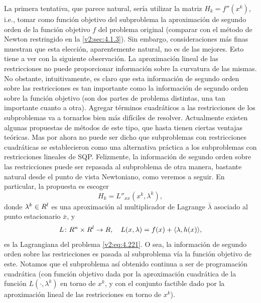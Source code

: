 La primera tentativa, que parece natural, sería utilizar la matriz $H_k = f''(x^k)$, i.e., tomar como función objetivo del subproblema la aproximación de segundo orden de la función objetivo $f$ del problema original (comparar con el método de Newton restringido en la \cref{v2:sec:4.1.3}). Sin embargo, consideraciones más finas muestran que esta elección, aparentemente natural, no es de las mejores. Esto tiene a ver con la siguiente observación. La aproximación lineal de las restricciones no puede proporcionar información sobre la curvatura de las mismas. No obstante, intuitivamente, es claro que esta información de segundo orden sobre las restricciones es tan importante como la información de segundo orden sobre la función objetivo (son dos partes de problema distintas, una tan importante cuanto a otra). Agregar términos cuadráticos a las restricciones de los subproblemas va a tornarlos bien más difíciles de resolver. Actualmente existen algunas propuestas de métodos de este tipo, que hasta tienen ciertas ventajas teóricas. Mas por ahora no puede ser dicho que subproblemas con restricciones cuadráticas se establecieron como una alternativa práctica a los subproblemas con restricciones lineales de SQP. Felizmente, la información de segundo orden sobre las restricciones puede ser repasada al subproblema de otra manera, bastante natural desde el punto de vista Newtoniano, como veremos a seguir. En particular, la propuesta es escoger
\begin{equation}
    H_k = L''_{xx}(x^k, \lambda^k),
    \label{v2:eq:4.223}
\end{equation}
donde $\lambda^k \in R^l$ es una aproximación al multiplicador de Lagrange $\bar{\lambda}$ asociado al punto estacionario $\bar{x}$, y
\[
    L \colon R^n \times R^l \to R, \quad L(x, \lambda) = f(x) + \langle \lambda, h(x) \rangle,
\]
es la Lagrangiana del problema \eqref{v2:eq:4.221}. O sea, la información de segundo orden sobre las restricciones es pasada al subproblema vía la función objetivo de este. Notamos que el subproblema así obtenido continua a ser de programación cuadrática (con función objetivo dada por la aproximación cuadrática de la función $L(\cdot, \lambda^k)$ en torno de $x^k$, y con el conjunto factible dado por la aproximación lineal de las restricciones en torno de $x^k$).

